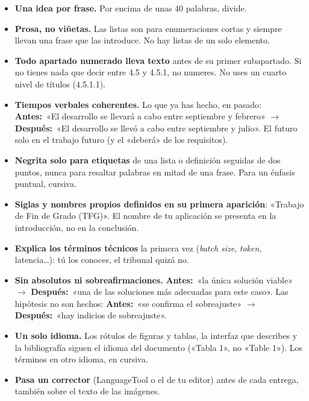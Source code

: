 \documentclass[11pt,a4paper]{article}
\newcommand{\antes}[1]{\textcolor{BrickRed!80!black}{\textbf{Antes:}}~«#1»}
\newcommand{\despues}[1]{\textcolor{ForestGreen!80!black}{\textbf{Después:}}~«#1»}
\begin{document}
\begin{itemize}
  \item \textbf{Una idea por frase.} Por encima de unas 40 palabras, divide.
  \item \textbf{Prosa, no viñetas.} Las listas son para enumeraciones cortas y
        siempre llevan una frase que las introduce. No hay listas de un solo
        elemento.
  \item \textbf{Todo apartado numerado lleva texto} antes de su primer
        subapartado. Si no tienes nada que decir entre 4.5 y 4.5.1, no numeres.
        No uses un cuarto nivel de títulos (4.5.1.1).
  \item \textbf{Tiempos verbales coherentes.} Lo que ya has hecho, en pasado:
        \antes{El desarrollo se llevará a cabo entre septiembre y febrero} $\rightarrow$
        \despues{El desarrollo se llevó a cabo entre septiembre y julio}. El
        futuro solo en el trabajo futuro (y el «deberá» de los requisitos).
  \item \textbf{Negrita solo para etiquetas} de una lista o definición seguidas
        de dos puntos, nunca para resaltar palabras en mitad de una frase. Para
        un énfasis puntual, cursiva.
  \item \textbf{Siglas y nombres propios definidos en su primera aparición}:
        «Trabajo de Fin de Grado (TFG)». El nombre de tu aplicación se presenta
        en la introducción, no en la conclusión.
  \item \textbf{Explica los términos técnicos} la primera vez (\emph{batch size},
        \emph{token}, latencia\ldots): tú los conoces, el tribunal quizá no.
  \item \textbf{Sin absolutos ni sobreafirmaciones.} \antes{la única solución
        viable} $\rightarrow$ \despues{una de las soluciones más adecuadas para
        este caso}. Las hipótesis no son hechos: \antes{se confirma el
        sobreajuste} $\rightarrow$ \despues{hay indicios de sobreajuste}.
  \item \textbf{Un solo idioma.} Los rótulos de figuras y tablas, la interfaz que
        describes y la bibliografía siguen el idioma del documento («Tabla 1», no
        «Table 1»). Los términos en otro idioma, en cursiva.
  \item \textbf{Pasa un corrector} (LanguageTool o el de tu editor) antes de cada
        entrega, también sobre el texto de las imágenes.
\end{itemize}

\end{document}
